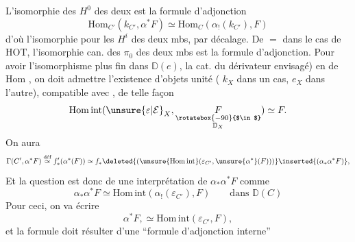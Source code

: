 L'isomorphie des $H^0$ des deux  est la formule d'adjonction
\[
 \mathrm{Hom}_{C'}(k_{C'},\alpha^*F)\simeq\mathrm{Hom}_C(\alpha_!(k_{C'}),F)
\]
d'où l'isomorphie pour les $H^i$ des deux mbs, par décalage.
De $=$ dans le cas de $\mathrm{HOT}$, l'isomorphie can. des $\pi_0$ des deux mbs est la formule d'adjonction.
Pour avoir l'isomorphisme plus fin dans $\mathbb D(e)$, la cat.  du dérivateur envisagé) en  de Hom ,
on doit  admettre l'existence d'objets unité ( $k_X$ dans un cas,  $e_X$ dans l'autre), compatible avec , de telle façon
\[
 \mathrm{Hom\,int}(\unsure{\varepsilon|\mathcal E}_X,\underset{\substack{\rotatebox{-90}{$\in$}\\\mathbb D_X}}{F})\simeq F .
\]
On aura
\[
 \Gamma(C',\alpha^*F)\overset{\text{déf}}{\simeq} f'_*(\alpha^*(F))\simeq
 f_*\deleted{(\unsure{\mathrm{Hom\,int}}(\varepsilon_{C'},\unsure{\alpha^*}(F)))}\inserted{(\alpha_*\alpha^*F)} ,
\]
Et la question est donc de  une interprétation de $\alpha_*\alpha^*F$ comme
\[
 \alpha_*\alpha^*F\simeq\mathrm{Hom\,int}(\alpha_!(\varepsilon_{C'}),F)
 \qquad\text{dans }\mathbb D(C)
\]
Pour ceci, on va écrire
\[
 \alpha^*F,\simeq\mathrm{Hom\,int}(\varepsilon_{C'},F),
\]
et la formule doit résulter d'une ``formule d'adjonction interne''
